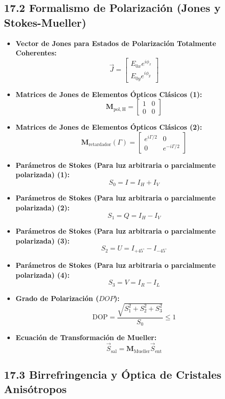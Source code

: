 \documentclass[11pt,a4paper]{article}
\begin{document}
\subsection*{17.2 Formalismo de Polarización (Jones y Stokes-Mueller)}

\begin{itemize}
  \item \textbf{Vector de Jones para Estados de Polarización Totalmente Coherentes:}
  \[
    \vec{J} = \begin{bmatrix} E_{0x} e^{i\phi_x} \\ E_{0y} e^{i\phi_y} \end{bmatrix}
  \]
  \item \textbf{Matrices de Jones de Elementos Ópticos Clásicos (1):}
  \[
    \mathbf{M}_{\mathrm{pol,H}} = \begin{bmatrix} 1 & 0 \\ 0 & 0 \end{bmatrix}
  \]
  \item \textbf{Matrices de Jones de Elementos Ópticos Clásicos (2):}
  \[
    \mathbf{M}_{\text{retardador}}(\Gamma) = \begin{bmatrix} e^{i\Gamma/2} & 0 \\ 0 & e^{-i\Gamma/2} \end{bmatrix}
  \]
  \item \textbf{Parámetros de Stokes (Para luz arbitraria o parcialmente polarizada) (1):}
  \[
    S_0 = I = I_H + I_V
  \]
  \item \textbf{Parámetros de Stokes (Para luz arbitraria o parcialmente polarizada) (2):}
  \[
    S_1 = Q = I_H - I_V
  \]
  \item \textbf{Parámetros de Stokes (Para luz arbitraria o parcialmente polarizada) (3):}
  \[
    S_2 = U = I_{+45^\circ} - I_{-45^\circ}
  \]
  \item \textbf{Parámetros de Stokes (Para luz arbitraria o parcialmente polarizada) (4):}
  \[
    S_3 = V = I_R - I_L
  \]
  \item \textbf{Grado de Polarización ($DOP$):}
  \[
    \mathrm{DOP} = \frac{\sqrt{S_1^2 + S_2^2 + S_3^2}}{S_0} \le 1
  \]
  \item \textbf{Ecuación de Transformación de Mueller:}
  \[
    \vec{S}_{\mathrm{sal}} = \mathbf{M}_{\text{Mueller}} \vec{S}_{\mathrm{ent}}
  \]
\end{itemize}

\subsection*{17.3 Birrefringencia y Óptica de Cristales Anisótropos}
\end{document}
